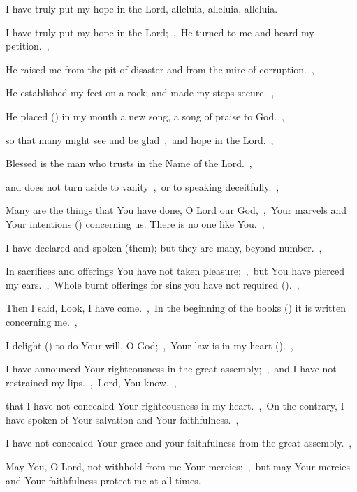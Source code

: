 \documentclass[12pt,twoside,a5paper]{article}
\begin{document}
\begin{halfparskip}
  I have truly put my hope in the Lord, alleluia, alleluia, alleluia.

  I have truly put my hope in the Lord;~\sep\ He turned to me and heard my petition.~\sep

  He raised me from the pit of disaster and from the mire of corruption.~\sep

  He established my feet on a rock; and made my steps secure.~\sep

  He placed () in my mouth a new song, a song of praise to God.~\sep

  so that many might see and be glad~\sep\ and hope in the Lord.~\sep

  Blessed is the man who trusts in the Name of the Lord.~\sep

  and does not turn aside to vanity~\sep\ or to speaking deceitfully.~\sep

  Many are the things that You have done, O Lord our God,~\sep\ Your marvels and Your intentions () concerning us. There is no one like You.~\sep

  I have declared and spoken (them); but they are many, beyond number.~\sep

  In sacrifices and offerings You have not taken pleasure;~\sep\ but You have pierced my ears.~\sep\ Whole burnt offerings for sins you have not required ().~\sep

  Then I said, Look, I have come.~\sep\ In the beginning of the books () it is written concerning me.~\sep

  I delight () to do Your will, O God;~\sep\ Your law is in my heart ().~\sep

  I have announced Your righteousness in the great assembly;~\sep\ and I have not restrained my lips.~\sep\ Lord, You know.~\sep

  that I have not concealed Your righteousness in my heart.~\sep\ On the contrary, I have spoken of Your salvation and Your faithfulness.~\sep

  I have not concealed Your grace and your faithfulness from the great assembly.~\sep

  May You, O Lord, not withhold from me Your mercies;~\sep\ but may Your mercies and Your faithfulness protect me at all times.
\end{halfparskip}
\end{document}
